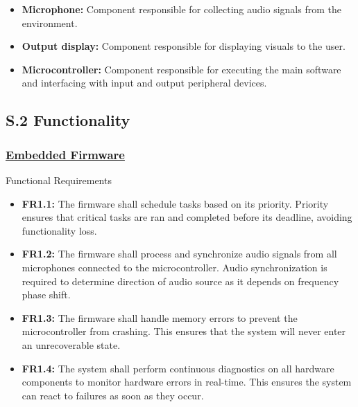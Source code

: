 \documentclass[12pt]{article}
\theoremstyle{definition}
\begin{document}
\begin{itemize}
  \item \textbf{Microphone:}\label{comp:microphone} Component responsible for
  collecting audio signals from the environment.

  \item \textbf{Output display:}\label{comp:display} Component responsible for
  displaying visuals to the user.

  \item \textbf{Microcontroller:} \label{comp:microcontroller} Component
  responsible for executing the main software and interfacing with input and
  output peripheral devices.
\end{itemize}

\subsection{S.2 Functionality} \label{sec:S.2}

\subsubsection{\hyperref[comp:embedded_firmware]{Embedded Firmware}} Functional
Requirements \label{sec:FR1}
\begin{itemize}
  \item \label{FR1_1}\textbf{FR1.1:} The firmware shall schedule tasks based on
  its priority. Priority ensures that critical tasks are ran and completed
  before its deadline, avoiding functionality loss.
  
  \item \label{FR1_2}\textbf{FR1.2:} The firmware shall process and synchronize
  audio signals from all microphones connected to the microcontroller. Audio
  synchronization is required to determine direction of audio source as it
  depends on frequency phase shift.

  \item \label{FR1_3}\textbf{FR1.3:} The firmware shall handle memory errors to
  prevent the microcontroller from crashing. This ensures that the system will
  never enter an unrecoverable state.

  \item \label{FR1_4}\textbf{FR1.4:} The system shall perform continuous
  diagnostics on all hardware components to monitor hardware errors in
  real-time. This ensures the system can react to failures as soon as they
  occur.
\end{itemize}
\end{document}
